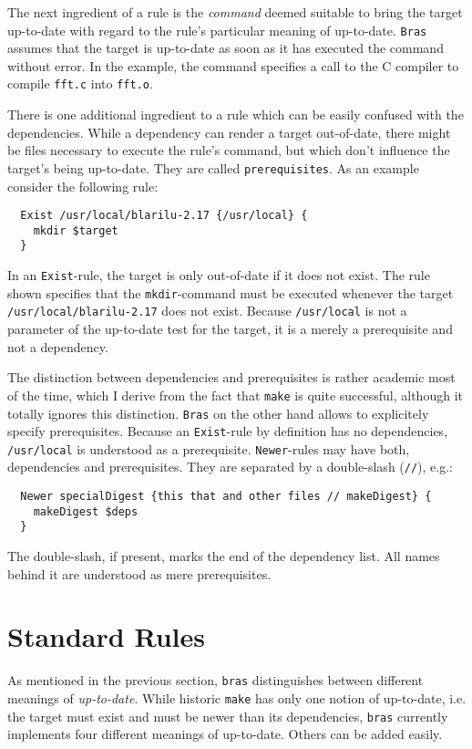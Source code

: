 \documentclass[12pt]{article}
\newcommand{\bras}{\texttt{bras}}
\newcommand{\Bras}{\texttt{Bras}}
\newcommand{\make}{\texttt{make}}
\begin{document}
The next ingredient of a rule is the \textit{command} deemed suitable
to bring the target up-to-date with regard to the rule's particular
meaning of up-to-date. \Bras{} assumes that the target
is up-to-date as soon as it has executed the command without error. In
the example, the command specifies a call to the C compiler to compile
\texttt{fft.c} into \texttt{fft.o}.

There is one additional ingredient to a rule which can be easily
confused with the dependencies. While a dependency can render a target
out-of-date, there might be files necessary to execute the rule's
command, but which don't influence the target's being up-to-date.
They are called \texttt{prerequisites}. As an example consider the
following rule:

\begin{verbatim}
  Exist /usr/local/blarilu-2.17 {/usr/local} {
    mkdir $target
  }
\end{verbatim}

In an \texttt{Exist}-rule, the target is only out-of-date if it does
not exist. The rule shown specifies that the \texttt{mkdir}-command
must be executed whenever the target \texttt{/usr/local/blarilu-2.17} does
not exist.  Because \texttt{/usr/local} is not a parameter of the
up-to-date test for the target, it is a merely a prerequisite and not
a dependency.

The distinction between dependencies and prerequisites is rather
academic most of the time, which I derive from the fact that \make{}
is quite successful, although it totally ignores this distinction.
\Bras{} on the other hand allows to explicitely specify prerequisites.
Because an \texttt{Exist}-rule by definition has no dependencies,
\texttt{/usr/local} is understood as a
prerequisite. \texttt{Newer}-rules may have both, dependencies and
prerequisites. They are separated by a double-slash (\texttt{//}), e.g.:

\begin{verbatim}
  Newer specialDigest {this that and other files // makeDigest} {
    makeDigest $deps
  }
\end{verbatim}

The double-slash, if present, marks the end of the dependency list.
All names behind it are understood as mere prerequisites.

\section{Standard Rules}
\label{SecStandardRules}
As mentioned in the previous section, \bras{} distinguishes between
different meanings of \textit{up-to-date}. While historic
\make{} has only one notion of up-to-date, i.e. the target must exist
and must be newer than its dependencies, \bras{} currently implements
four different meanings of up-to-date. Others can be added
easily.
\end{document}

